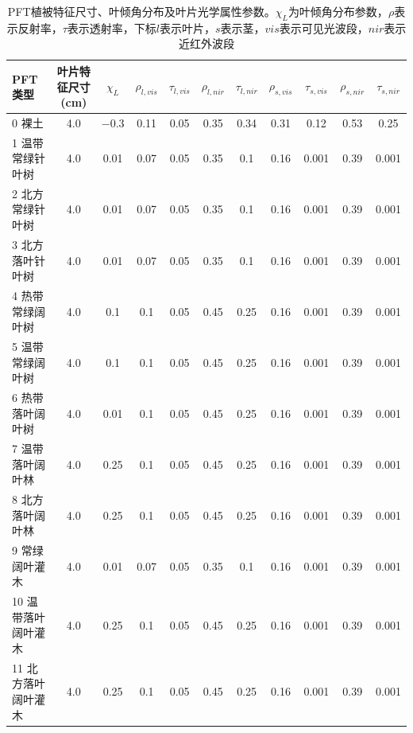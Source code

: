 \begin{landscape}
\begin{table}[htbp]    
    \centering
    \caption[PFT植被特征尺寸、叶倾角分布及叶片光学属性参数]{PFT植被特征尺寸、叶倾角分布及叶片光学属性参数。$\chi_L$为叶倾角分布参数，$\rho$表示反射率，$\tau$表示透射率，下标$l$表示叶片，$s$表示茎，$vis$表示可见光波段，$nir$表示近红外波段}
    \label{tab:PFT植被特征尺寸叶倾角分布及叶片光学属性参数1}
        \begin{tabular}{@{}lcccccccccc@{}}
        \toprule
        PFT类型   & 叶片特征尺寸(cm) & $\chi_L$ &$\rho_{l, vis}$ & $\tau_{l, vis}$  &$\rho_{l, nir}$ &$\tau_{l, nir}$ & $\rho_{s, vis}$ &$\tau_{s, vis}$ &$\rho_{s, nir}$ &$\tau_{s,nir}$\\ \midrule
        0 裸土           & 4.0        & \num { -0.3 } & 0.11 & 0.05 & 0.35 & 0.34 & 0.31 & 0.12  & 0.53 & 0.25  \\
        1 温带常绿针叶树   & 4.0        & 0.01 & 0.07 & 0.05 & 0.35 & 0.1  & 0.16 & 0.001 & 0.39 & 0.001 \\
        2 北方常绿针叶树   & 4.0        & 0.01 & 0.07 & 0.05 & 0.35 & 0.1  & 0.16 & 0.001 & 0.39 & 0.001 \\
        3 北方落叶针叶树   & 4.0        & 0.01 & 0.07 & 0.05 & 0.35 & 0.1  & 0.16 & 0.001 & 0.39 & 0.001 \\
        4 热带常绿阔叶树   & 4.0        & 0.1  & 0.1  & 0.05 & 0.45 & 0.25 & 0.16 & 0.001 & 0.39 & 0.001 \\
        5 温带常绿阔叶树   & 4.0        & 0.1  & 0.1  & 0.05 & 0.45 & 0.25 & 0.16 & 0.001 & 0.39 & 0.001 \\
        6 热带落叶阔叶树   & 4.0        & 0.01 & 0.1  & 0.05 & 0.45 & 0.25 & 0.16 & 0.001 & 0.39 & 0.001 \\
        7 温带落叶阔叶林   & 4.0        & 0.25 & 0.1  & 0.05 & 0.45 & 0.25 & 0.16 & 0.001 & 0.39 & 0.001 \\
        8 北方落叶阔叶林   & 4.0        & 0.25 & 0.1  & 0.05 & 0.45 & 0.25 & 0.16 & 0.001 & 0.39 & 0.001 \\
        9 常绿阔叶灌木    & 4.0        & 0.01 & 0.07 & 0.05 & 0.35 & 0.1  & 0.16 & 0.001 & 0.39 & 0.001 \\
        10 温带落叶阔叶灌木 & 4.0        & 0.25 & 0.1  & 0.05 & 0.45 & 0.25 & 0.16 & 0.001 & 0.39 & 0.001 \\
        11 北方落叶阔叶灌木 & 4.0        & 0.25 & 0.1  & 0.05 & 0.45 & 0.25 & 0.16 & 0.001 & 0.39 & 0.001 \\ %

\end{tabular}
\end{table}
\end{landscape}
